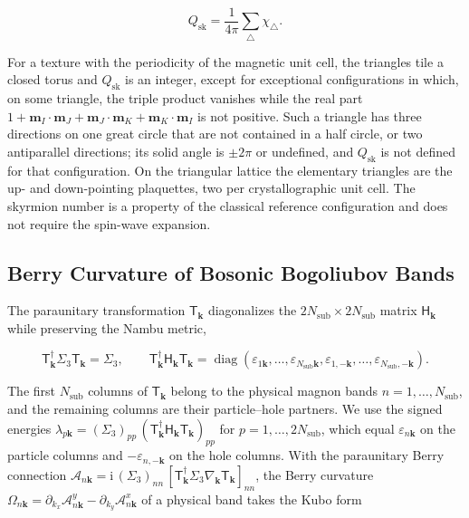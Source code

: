 \begin{equation}\label{eq-lswt-lattice-skyrmion-number}
Q_{\mathrm{sk}}=\frac{1}{4\pi}\sum_{\triangle}\chi_{\triangle}.
\end{equation}

For a texture with the periodicity of the magnetic unit cell, the triangles tile a closed torus and \(Q_{\mathrm{sk}}\) is an integer, except for exceptional configurations in which, on some triangle, the triple product vanishes while the real part \(1+\mathbf m_I\cdot\mathbf m_J+\mathbf m_J\cdot\mathbf m_K+\mathbf m_K\cdot\mathbf m_I\) is not positive. Such a triangle has three directions on one great circle that are not contained in a half circle, or two antiparallel directions; its solid angle is \(\pm2\pi\) or undefined, and \(Q_{\mathrm{sk}}\) is not defined for that configuration. On the triangular lattice the elementary triangles are the up- and down-pointing plaquettes, two per crystallographic unit cell. The skyrmion number is a property of the classical reference configuration and does not require the spin-wave expansion.

\subsection{Berry Curvature of Bosonic Bogoliubov Bands}

The paraunitary transformation \(\mathsf T_{\mathbf k}\) diagonalizes the \(2N_{\mathrm{sub}}\times2N_{\mathrm{sub}}\) matrix \(\mathsf H_{\mathbf k}\) while preserving the Nambu metric,

\[
\mathsf T_{\mathbf k}^\dagger\Sigma_3\mathsf T_{\mathbf k}=\Sigma_3,
\qquad
\mathsf T_{\mathbf k}^\dagger\mathsf H_{\mathbf k}\mathsf T_{\mathbf k}
=\operatorname{diag}\!\left(\varepsilon_{1\mathbf k},\ldots,\varepsilon_{N_{\mathrm{sub}}\mathbf k},\varepsilon_{1,-\mathbf k},\ldots,\varepsilon_{N_{\mathrm{sub}},-\mathbf k}\right).
\]

The first \(N_{\mathrm{sub}}\) columns of \(\mathsf T_{\mathbf k}\) belong to the physical magnon bands \(n=1,\ldots,N_{\mathrm{sub}}\), and the remaining columns are their particle--hole partners. We use the signed energies \(\lambda_{p\mathbf k}=(\Sigma_3)_{pp}\,(\mathsf T_{\mathbf k}^\dagger\mathsf H_{\mathbf k}\mathsf T_{\mathbf k})_{pp}\) for \(p=1,\ldots,2N_{\mathrm{sub}}\), which equal \(\varepsilon_{n\mathbf k}\) on the particle columns and \(-\varepsilon_{n,-\mathbf k}\) on the hole columns. With the paraunitary Berry connection \(\mathcal A_{n\mathbf k}=\mathrm i\,(\Sigma_3)_{nn}\,[\mathsf T_{\mathbf k}^\dagger\Sigma_3\nabla_{\mathbf k}\mathsf T_{\mathbf k}]_{nn}\), the Berry curvature \(\Omega_{n\mathbf k}=\partial_{k_x}\mathcal A^y_{n\mathbf k}-\partial_{k_y}\mathcal A^x_{n\mathbf k}\) of a physical band takes the Kubo form

